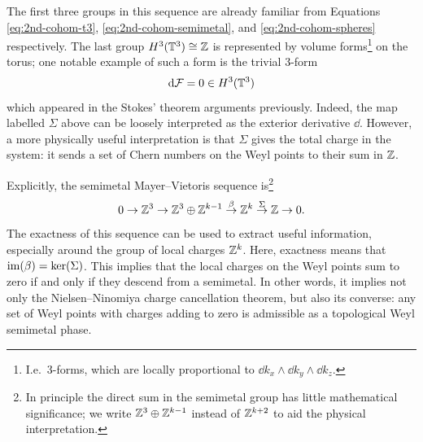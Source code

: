 The first three groups in this sequence are already familiar from Equations \eqref{eq:2nd-cohom-t3}, \eqref{eq:2nd-cohom-semimetal}, and \eqref{eq:2nd-cohom-spheres} respectively. The last group $H^3(\mathbb{T}^3)\cong\mathbb{Z}$ is represented by volume forms\footnote{
	I.e.\ 3-forms, which are locally proportional to $\dd{k_x}\wedge\dd{k_y}\wedge\dd{k_z}$.}
on the torus; one notable example of such a form is the trivial 3-form
\begin{equation*}
	\dd{\mathcal{F}} = 0 \in H^3(\mathbb{T}^3)
\end{equation*}
which appeared in the Stokes' theorem arguments previously. Indeed, the map labelled $\Sigma$ above can be loosely interpreted as the exterior derivative $\dd$. However, a more physically useful interpretation is that $\Sigma$ gives the total charge in the system: it sends a set of Chern numbers on the Weyl points to their sum in $\mathbb{Z}$.

Explicitly, the semimetal Mayer--Vietoris sequence is\footnote{
	In principle the direct sum in the semimetal group has little mathematical significance; we write $\mathbb{Z}^3\oplus\mathbb{Z}^{k-1}$ instead of $\mathbb{Z}^{k+2}$ to aid the physical interpretation.}
\begin{equation}\label{eq:semimetal-MV-explicit}
	0 \to \mathbb{Z}^3 \to \mathbb{Z}^3\oplus\mathbb{Z}^{k-1} \overset{\beta}{\to} \mathbb{Z}^k \overset{\Sigma}{\to} \mathbb{Z} \to 0.
\end{equation}
The exactness of this sequence can be used to extract useful information, especially around the group of local charges $\mathbb{Z}^k$. Here, exactness means that $\operatorname{im}(\beta) = \ker(\Sigma)$. This implies that the local charges on the Weyl points sum to zero if and only if they descend from a semimetal. In other words, it implies not only the Nielsen--Ninomiya charge cancellation theorem, but also its converse: any set of Weyl points with charges adding to zero is admissible as a topological Weyl semimetal phase.

